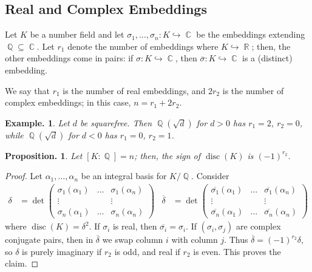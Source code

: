 \documentclass[11pt, a4paper]{memoir}
\DeclareMathOperator{\Q}{{\mathbb{Q}}}
\DeclareMathOperator{\R}{{\mathbb{R}}}
\DeclareMathOperator{\C}{{\mathbb{C}}}
\newcommand{\hto}[0]{\ensuremath{\hookrightarrow}}
\newcommand{\ol}[1]{\ensuremath{\overline{#1}}}
\theoremstyle{change}
\newtheorem{proposition}[theorem]{Proposition.}
\theoremstyle{plain}
\theoremstyle{nonumberplain}
\newtheorem{example}{Example.}
\newtheorem{proof}{Proof}
\DeclareMathOperator{\disc}{disc}
\numberwithin{equation}{section}
\begin{document}
\subsection{Real and Complex Embeddings}
Let $K$ be a number field and let $\sigma_1,\ldots,\sigma_n:K\hto\C$ be the embeddings extending $\Q\subseteq\C$.
Let $r_1$ denote the number of embeddings where $K\hto\R$; then, the other embeddings come in pairs: if $\sigma:K\hto\C$, then $\ol{\sigma}:K\hto\C$ is a (distinct) embedding.

We say that $r_1$ is the number of real embeddings, and $2r_2$ is the number of complex embeddings; in this case, $n=r_1+2r_2$.
\begin{example}
    Let $d$ be squarefree.
    Then $\Q(\sqrt{d})$ for $d>0$ has $r_1=2$, $r_2=0$, while $\Q(\sqrt{d})$ for $d<0$ has $r_1=0$, $r_2=1$.
\end{example}
\begin{proposition}
    Let $[K:\Q]=n$; then, the sign of $\disc(K)$ is $(-1)^{r_2}$.
\end{proposition}
\begin{proof}
    Let $\alpha_1,\ldots,\alpha_n$ be an integral basis for $K/\Q$.
    Consider
    \begin{align*}
        \delta&=\det
        \begin{pmatrix}
            \sigma_1(\alpha_1)&\hdots&\sigma_1(\alpha_n)\\
            \vdots&&\vdots\\
            \sigma_n(\alpha_1)&\hdots&\sigma_n(\alpha_n)
        \end{pmatrix}
        &
        \ol{\delta}&=\det
        \begin{pmatrix}
            \ol{\sigma_1}(\alpha_1)&\hdots&\ol{\sigma_1}(\alpha_n)\\
            \vdots&&\vdots\\
            \ol{\sigma_n}(\alpha_1)&\hdots&\ol{\sigma_n}(\alpha_n)
        \end{pmatrix}
    \end{align*}
    where $\disc(K)=\delta^2$.
    If $\sigma_i$ is real, then $\ol{\sigma_i}=\sigma_i$.
    If $(\sigma_i,\sigma_j)$ are complex conjugate pairs, then in $\ol{\delta}$ we swap column $i$ with column $j$.
    Thus $\ol{\delta}=(-1)^{r_2}\delta$, so $\delta$ is purely imaginary if $r_2$ is odd, and real if $r_2$ is even.
    This proves the claim.
\end{proof}
\end{document}
